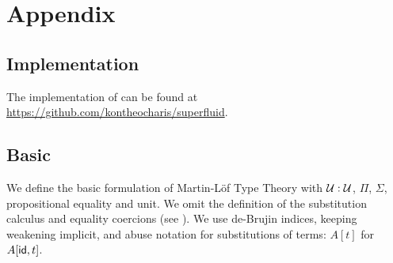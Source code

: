 \section{Appendix}

\allowdisplaybreaks

\subsection{Implementation}

The implementation of \superfluid can be found at \url{https://github.com/kontheocharis/superfluid}.

\subsection{Basic \lambdamltt}

We define the basic formulation of Martin-Löf Type Theory with $\mathcal{U} :
\mathcal{U}$, $\Pi$, $\Sigma$, propositional equality and unit. We omit the
definition of the substitution calculus and equality coercions
(see \cite[5.1.2]{Castellan2019-qo}). We use de-Brujin indices, keeping weakening
implicit, and abuse notation for substitutions of terms: $A[t]$ for $A[\textsf{id},
t]$.

\newcommand{\refl}{\mta{refl}}
\newcommand{\fst}{\mta{fst}}
\newcommand{\snd}{\mta{snd}}
\newcommand{\pair}{\mta{pair}}
\newcommand{\app}{\mta{app}}
\newcommand{\lam}{\mta{lam}}
\newcommand{\J}{\mta{J}}


